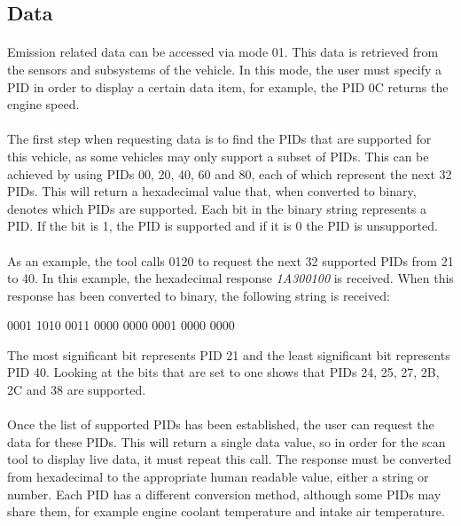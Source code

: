 	\subsection{Data}{
		\paragraph{}{
		Emission related data can be accessed via mode 01. This data is retrieved from the sensors and subsystems of the vehicle. In this mode, the user must specify a PID in order to display a certain data item, for example, the PID 0C returns the engine speed.
		}
		\paragraph{}{
		The first step when requesting data is to find the PIDs that are supported for this vehicle, as some vehicles may only support a subset of PIDs. This can be achieved by using PIDs 00, 20, 40, 60 and 80, each of which represent the next 32 PIDs. This will return a hexadecimal value that, when converted to binary, denotes which PIDs are supported. Each bit in the binary string represents a PID. If the bit is 1, the PID is supported and if it is 0 the PID is unsupported.
						
		}
		\paragraph{}{
		As an example, the tool calls 0120 to request the next 32 supported PIDs from 21 to 40. In this example, the hexadecimal response \textit{1A300100} is received. When this response has been converted to binary, the following string is received:
		\begin{center}
			0001 1010 0011 0000 0000 0001 0000 0000\\
		\end{center}
		The most significant bit represents PID 21 and the least significant bit represents PID 40. Looking at the bits that are set to one shows that PIDs 24, 25, 27, 2B, 2C and 38 are supported.
		}
		\paragraph{}{
		Once the list of supported PIDs has been established, the user can request the data for these PIDs. This will return a single data value, so in order for the scan tool to display live data, it must repeat this call. The response must be converted from hexadecimal to the appropriate human readable value, either a string or number. Each PID has a different conversion method, although some PIDs may share them, for example engine coolant temperature and intake air temperature.
		}
	}
	\label{ssec:Data}
		
